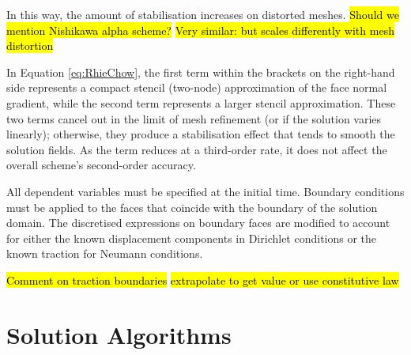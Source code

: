 \documentclass[sn-mathphys,Numbered]{sn-jnl}%
\newcommand{\bb}{\boldsymbol}
\begin{document}
In this way, the amount of stabilisation increases on distorted meshes.
\hl{Should we mention Nishikawa alpha scheme?} \hl{Very similar: but scales differently with mesh distortion}

In Equation \ref{eq:RhieChow}, the first term within the brackets on the right-hand side represents a compact stencil (two-node) approximation of the face normal gradient, while the second term represents a larger stencil approximation.
These two terms cancel out in the limit of mesh refinement (or if the solution varies linearly); otherwise, they produce a stabilisation effect that tends to smooth the solution fields.
As the term reduces at a third-order rate, it does not affect the overall scheme's second-order accuracy.

All dependent variables must be specified at the initial time.
Boundary conditions must be applied to the faces that coincide with the boundary of the solution domain.
The discretised expressions on boundary faces are modified to account for either the known displacement components in Dirichlet conditions or the known traction for Neumann conditions.



\hl{Comment on traction boundaries} \hl{extrapolate to get value or use constitutive law}



\section{Solution Algorithms}\label{sec:sol_alg}


\end{document}
